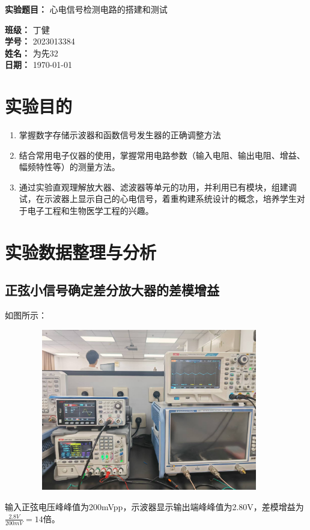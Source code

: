 \documentclass{article}
\begin{document}
\begin{titlepage}
    \centering
    
    \vspace*{1cm}
    \Huge
    \textbf{实验题目：} 心电信号检测电路的搭建和测试
    
    \vspace{8cm}
    
    \large
    \textbf{班级：} 丁健 \\
    \textbf{学号：} 2023013384 \\
    \textbf{姓名：} 为先32 \\ 
    \textbf{日期：} \today

\end{titlepage}
\section{实验目的}
\begin{enumerate}
    \item 掌握数字存储示波器和函数信号发生器的正确调整方法
    \item 结合常用电子仪器的使用，掌握常用电路参数（输入电阻、输出电阻、增益、幅频特性等）的测量方法。
    \item 通过实验直观理解放大器、滤波器等单元的功用，并利用已有模块，组建调试，在示波器上显示自己的心电信号，着重构建系统设计的概念，培养学生对于电子工程和生物医学工程的兴趣。
\end{enumerate}

\section{实验数据整理与分析}
\subsection{正弦小信号确定差分放大器的差模增益}
如图所示：
\begin{figure}[htbp]
    \centering
    \includegraphics[width=300pt,height=200pt]{zengda.jpg}
\end{figure}
输入正弦电压峰峰值为200mVpp，示波器显示输出端峰峰值为2.80V，差模增益为$\frac{2.8V}{200mV} = 14$倍。
\end{document}
